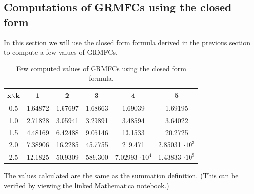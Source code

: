 \documentclass[12pt]{article}
\numberwithin{equation}{section}
\begin{document}
\subsection{Computations of GRMFCs using the closed form}
In this section we will use the closed form formula derived in the previous section to compute a few values of GRMFCs.
\begin{table}[h!]
\centering
\begin{tabular}{@{}cccccc@{}}
\toprule
x$\backslash$k & 1 & 2 & 3 & 4 & 5 \\ \midrule
0.5 & 1.64872 & 1.67697 & 1.68663 & 1.69039 & 1.69195 \\
1.0 & 2.71828 & 3.05941 & 3.29891 & 3.48594 & 3.64022 \\
1.5 & 4.48169 & 6.42488 & 9.06146 & 13.1533 & 20.2725 \\
2.0 & 7.38906 & 16.2285 & 45.7755 & 219.471 & 2.85031 $\cdot 10^3$ \\
2.5 & 12.1825 & 50.9309 & 589.300 & 7.02993 $\cdot 10^4$ & 1.43833 $\cdot 10^9$ \\ \bottomrule
\end{tabular}
\caption{Few computed values of GRMFCs using the closed form formula.}
\label{tab:GRMFCexamples}
\end{table}
\par The values calculated are the same as the summation definition. (This can be verified by viewing the linked Mathematica notebook.)
\end{document}
